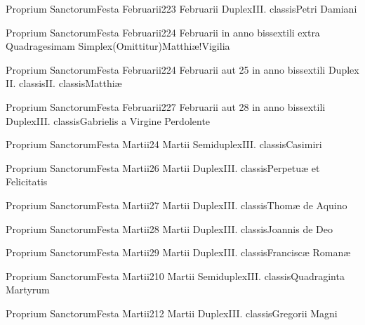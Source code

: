 \documentclass[invitatoriale-romanum.tex]{subfiles}
\begin{document}
	{Proprium Sanctorum}{Festa Februarii}{2}{23 Februarii}
	{Duplex}{III. classis}{Petri Damiani}
	{}
	{}

	{Proprium Sanctorum}{Festa Februarii}{2}{24 Februarii in anno bissextili extra Quadragesimam}
	{Simplex}{(Omittitur)}{Matthiæ!Vigilia}
	{}
	{}
\invitferia

	{Proprium Sanctorum}{Festa Februarii}{2}{24 Februarii aut 25 in anno bissextili}
	{Duplex II. classis}{II. classis}{Matthiæ}
	{}
	{}

	{Proprium Sanctorum}{Festa Februarii}{2}{27 Februarii aut 28 in anno bissextili}
	{Duplex}{III. classis}{Gabrielis a Virgine Perdolente}
	{}
	{}



	{Proprium Sanctorum}{Festa Martii}{2}{4 Martii}
	{Semiduplex}{III. classis}{Casimiri}
	{}
	{}

	{Proprium Sanctorum}{Festa Martii}{2}{6 Martii}
	{Duplex}{III. classis}{Perpetuæ et Felicitatis}
	{}
	{}

	{Proprium Sanctorum}{Festa Martii}{2}{7 Martii}
	{Duplex}{III. classis}{Thomæ de Aquino}
	{}
	{}

	{Proprium Sanctorum}{Festa Martii}{2}{8 Martii}
	{Duplex}{III. classis}{Joannis de Deo}
	{}
	{}

	{Proprium Sanctorum}{Festa Martii}{2}{9 Martii}
	{Duplex}{III. classis}{Franciscæ Romanæ}
	{}
	{}

	{Proprium Sanctorum}{Festa Martii}{2}{10 Martii}
	{Semiduplex}{III. classis}{Quadraginta Martyrum}
	{}
	{}

	{Proprium Sanctorum}{Festa Martii}{2}{12 Martii}
	{Duplex}{III. classis}{Gregorii Magni}
	{}
	{}
\end{document}
